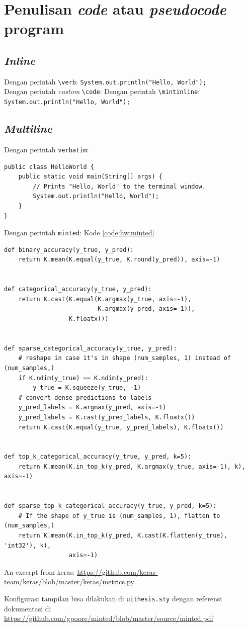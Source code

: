 \section{Penulisan \textit{code} atau \textit{pseudocode} program}

\subsection{\textit{Inline}}

Dengan perintah \verb|\verb|: \verb|System.out.println("Hello, World");| \\
Dengan perintah \textit{custom} \verb|\code|: 
Dengan perintah \verb|\mintinline|: \texttt{System.out.println("Hello, World"); }

\subsection{\textit{Multiline}}

Dengan perintah \verb|verbatim|: 

\begin{verbatim}	
public class HelloWorld {
    public static void main(String[] args) {
        // Prints "Hello, World" to the terminal window.
        System.out.println("Hello, World");
    }
}
\end{verbatim}

Dengan perintah \verb|minted|: Kode \ref{code:hw:minted}
\begin{listing}[H]
    \begin{verbatim}
def binary_accuracy(y_true, y_pred):
    return K.mean(K.equal(y_true, K.round(y_pred)), axis=-1)


def categorical_accuracy(y_true, y_pred):
    return K.cast(K.equal(K.argmax(y_true, axis=-1),
                          K.argmax(y_pred, axis=-1)),
                  K.floatx())


def sparse_categorical_accuracy(y_true, y_pred):
    # reshape in case it's in shape (num_samples, 1) instead of (num_samples,)
    if K.ndim(y_true) == K.ndim(y_pred):
        y_true = K.squeeze(y_true, -1)
    # convert dense predictions to labels
    y_pred_labels = K.argmax(y_pred, axis=-1)
    y_pred_labels = K.cast(y_pred_labels, K.floatx())
    return K.cast(K.equal(y_true, y_pred_labels), K.floatx())


def top_k_categorical_accuracy(y_true, y_pred, k=5):
    return K.mean(K.in_top_k(y_pred, K.argmax(y_true, axis=-1), k), axis=-1)


def sparse_top_k_categorical_accuracy(y_true, y_pred, k=5):
    # If the shape of y_true is (num_samples, 1), flatten to (num_samples,)
    return K.mean(K.in_top_k(y_pred, K.cast(K.flatten(y_true), 'int32'), k),
                  axis=-1)
    \end{verbatim}
    \caption{An excerpt from keras: \url{https://github.com/keras-team/keras/blob/master/keras/metrics.py}}
    \label{code:hw:minted}
\end{listing}

Konfigurasi tampilan bisa dilakukan di \verb|uithesis.sty| dengan referensi dokumentasi di \url{https://github.com/gpoore/minted/blob/master/source/minted.pdf}

\fi